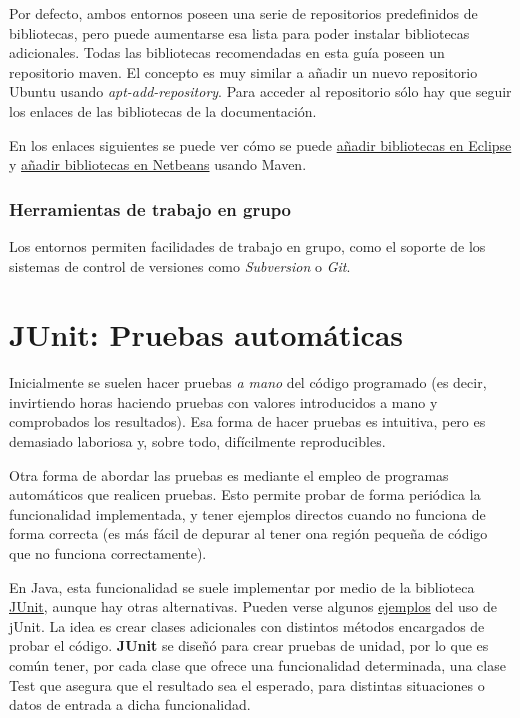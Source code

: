 \documentclass[11pt]{article}
\begin{document}
Por defecto, ambos entornos poseen una serie de repositorios predefinidos de
bibliotecas, pero puede aumentarse esa lista para poder instalar bibliotecas
adicionales. Todas las bibliotecas recomendadas en esta guía poseen un
repositorio maven. El concepto es muy similar a añadir un nuevo repositorio
Ubuntu usando \emph{apt-add-repository}. Para acceder al repositorio sólo hay que seguir los
enlaces de las bibliotecas de la documentación.


En los enlaces siguientes se puede ver cómo se puede \href{http://m2eclipse.sonatype.org/adding-project-dependencies-in-m2eclipse.html}{añadir bibliotecas en Eclipse} y \href{http://wiki.netbeans.org/MavenBestPractices}{añadir bibliotecas en Netbeans} usando Maven.


\subsubsection{Herramientas de trabajo en grupo}
\label{sec-3-2-6}

Los entornos permiten facilidades de trabajo en grupo, como el soporte de los
sistemas de control de versiones como \emph{Subversion} o \emph{Git}.


\section{JUnit: Pruebas automáticas} \label{sec-4}

Inicialmente se suelen hacer pruebas
\emph{a mano} del código programado (es decir, invirtiendo horas haciendo pruebas con valores
introducidos a mano y comprobados los resultados). Esa forma de hacer pruebas es
intuitiva, pero es demasiado laboriosa y, sobre todo, difícilmente reproducibles. 

Otra forma de abordar las pruebas es mediante el empleo de programas automáticos
que realicen pruebas. Esto permite probar de forma periódica la funcionalidad
implementada, y tener ejemplos directos cuando no funciona de forma correcta (es
más fácil de depurar al tener ona región pequeña de código que no funciona
correctamente).

En Java, esta funcionalidad se suele implementar por medio de la biblioteca
\href{http://junit.sourceforge.net/}{JUnit}, aunque hay otras alternativas. Pueden verse algunos
\href{http://www.slideshare.net/tom.zimmermann/unit-testing-with-junit}{ejemplos} del uso de jUnit. La idea es crear clases adicionales con distintos métodos encargados de
probar el código. \textbf{JUnit} se diseñó para crear pruebas de unidad, por lo
que es común tener, por cada clase que ofrece una funcionalidad determinada, una clase
Test que asegura que el resultado sea el esperado, para distintas
situaciones o datos de entrada a dicha funcionalidad.
\end{document}

